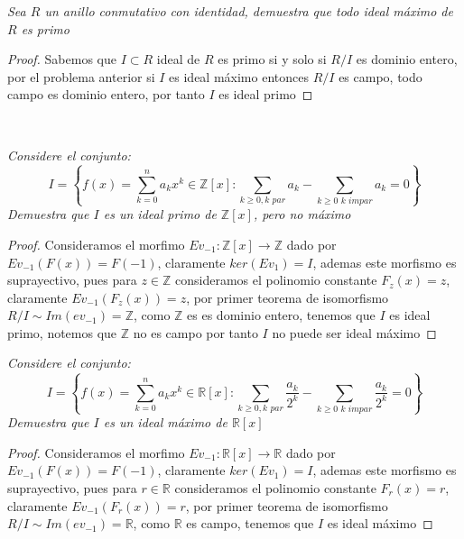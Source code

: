 \documentclass[11pt,letterpaper]{article}
\newcommand{\R}{\mathbb{R}}
\newcommand{\Z}{\mathbb{Z}}
\begin{document}
\begin{tcolorbox}[
	title = \textcolor{black}{\textcolor{white}{Problema 4}},]
\textit{Sea $R$ un anillo conmutativo con identidad, demuestra que todo ideal m\'aximo de $R$ es primo
}
\end{tcolorbox}
\begin{proof}
    Sabemos  que $I\subset R$ ideal de $R$ es primo si y solo si $R/ I$ es dominio entero, por el problema anterior si $I$ es ideal m\'aximo
    entonces $R/ I$ es campo, todo campo es dominio entero, por tanto $I$ es ideal primo
\end{proof}\,\\
    \begin{tcolorbox}[
	title = \textcolor{black}{\textcolor{white}{Problema 5}},]
\textit{Considere el conjunto:\,\\
\begin{equation*}
    I=\left\{f(x)=\displaystyle\sum_{k=0}^{n}a_kx^k\in \Z[x]:\sum_{k\geq 0, k\,\,par}a_k-\sum_{k\geq 0\,\,k\,\,impar}a_k=0\right\}
\end{equation*}
Demuestra que $I$ es un ideal primo de $\Z[x]$, pero no m\'aximo
}
\end{tcolorbox}
\begin{proof}
    Consideramos el morfimo $Ev_{-1}:\Z[x]\to\Z$ dado por $Ev_{-1}(F(x))=F(-1)$, claramente $ker(Ev_1)=I$, ademas este morfismo es suprayectivo, pues
    para $z\in\Z$ consideramos el polinomio constante $F_{z}(x)=z$, claramente $Ev_{-1}(F_{z}(x))=z$, por primer teorema de isomorfismo $R/I\sim Im(ev_{-1})=\Z$, como $\Z$ es 
    es dominio entero, tenemos que $I$ es ideal primo, notemos que $\Z$ no es campo por tanto $I$ no puede ser ideal m\'aximo
\end{proof}
\begin{tcolorbox}[
	title = \textcolor{black}{\textcolor{white}{Problema 6}},]
\textit{Considere el conjunto:\,\\
\begin{equation*}
    I=\left\{f(x)=\displaystyle\sum_{k=0}^{n}a_kx^k\in \R[x]:\sum_{k\geq 0, k\,\,par}\frac{a_k}{2^k}-\sum_{k\geq 0\,\,k\,\,impar}\frac{a_k}{2^k}=0\right\}
\end{equation*}
Demuestra que $I$ es un ideal m\'aximo de $\R[x]$
}
\end{tcolorbox}
\begin{proof}
    Consideramos el morfimo $Ev_{-1}:\R[x]\to\R$ dado por $Ev_{-1}(F(x))=F(-1)$, claramente $ker(Ev_1)=I$, ademas este morfismo es suprayectivo, pues
    para $r\in\R$ consideramos el polinomio constante $F_{r}(x)=r$, claramente $Ev_{-1}(F_{r}(x))=r$, por primer teorema de isomorfismo $R/I\sim Im(ev_{-1})=\R$, como $\R$ es 
    campo, tenemos que $I$ es ideal m\'aximo
\end{proof}
\end{document}
